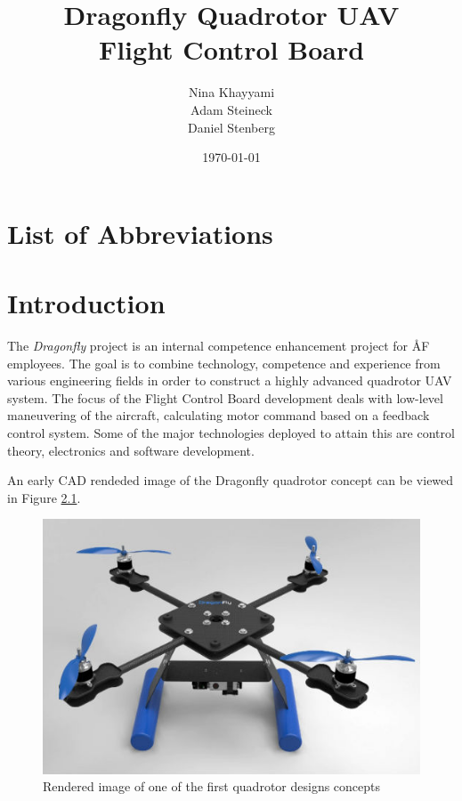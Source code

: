 \documentclass[a4paper]{report}
\title{Dragonfly Quadrotor UAV \\ Flight Control Board}
\author{Nina Khayyami \\ Adam Steineck \\ Daniel Stenberg }
\date{\today}         			%
\begin{document}

\maketitle                      		%

\newpage

\tableofcontents				%

\newpage

\chapter{List of Abbreviations}

\chapter{Introduction}

The \emph{Dragonfly} project is an internal competence enhancement project for ÅF employees. The goal is to combine technology, competence and experience from various engineering fields in order to construct a highly advanced quadrotor UAV system. The focus of the Flight Control Board development deals with low-level maneuvering of the aircraft, calculating motor command based on a feedback control system. Some of the major technologies deployed to attain this are control theory, electronics and software development.

An early CAD rendeded image of the Dragonfly quadrotor concept can be viewed in Figure \ref{fig:quadrendered1}.

\begin{figure}[h]
    \centering
    \includegraphics[scale=0.4]{images/quad_concept1_rendered.jpg}
    \caption{Rendered image of one of the first quadrotor designs concepts}
    \label{fig:quadrendered1}
\end{figure}
\end{document}
